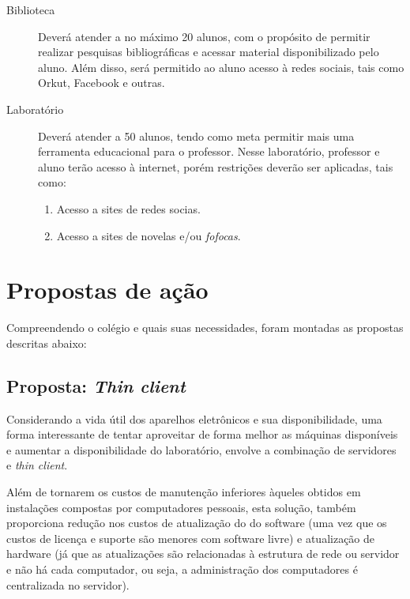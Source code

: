 \documentclass[a4paper,12pt]{report}
\begin{document}
            \begin{description}

                \item[Biblioteca] Deverá atender a no máximo 20 alunos, com o
                propósito de permitir realizar pesquisas bibliográficas e
                acessar material disponibilizado pelo aluno. Além disso, será
                permitido ao aluno acesso à redes sociais, tais como Orkut,
                Facebook e outras.

                \item[Laboratório] Deverá atender a 50 alunos, tendo como meta
                permitir mais uma ferramenta educacional para o professor. Nesse
                laboratório, professor e aluno terão acesso à internet, porém
                restrições deverão ser aplicadas, tais como:

                \begin{enumerate}

                    \item Acesso a sites de redes socias.

                    \item Acesso a sites de novelas e/ou \emph{fofocas}.

                \end{enumerate}

            \end{description}

        \section{Propostas de ação}
        \label{sc:laboratorio_proposta}
        Compreendendo o colégio e quais suas necessidades, foram montadas
        as propostas descritas abaixo:

            \subsection{Proposta: \emph{Thin client}}
            Considerando a vida útil dos aparelhos eletrônicos e sua
            disponibilidade, uma forma interessante de tentar aproveitar de
            forma melhor as máquinas disponíveis e aumentar a disponibilidade
            do laboratório, envolve a combinação de servidores e \emph{thin
            client}.

            Além de tornarem os custos de manutenção inferiores àqueles
            obtidos em instalações compostas por computadores pessoais, esta
            solução, também proporciona redução nos custos de atualização do
            do software (uma vez que os custos de licença e suporte são
            menores com software livre) e atualização de hardware (já que as
            atualizações são relacionadas à estrutura de rede ou servidor e não
            há cada computador, ou seja, a administração dos computadores é
            centralizada no servidor).
\end{document}
